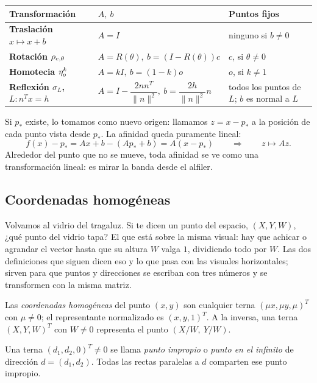 \begin{center}
\begin{tabularx}{\textwidth}{>{\bfseries}l l X}
\toprule
Transformación & \(A,\ b\) & Puntos fijos\\
\midrule
Traslación \(x\mapsto x+b\) & \(A=I\) & ninguno si \(b\neq0\)\\
Rotación \(\rho_{c,\theta}\) & \(A=R(\theta),\ b=(I-R(\theta))c\) & \(c\), si \(\theta\neq0\)\\
Homotecia \(\eta_{o}^{k}\) & \(A=kI,\ b=(1-k)o\) & \(o\), si \(k\neq1\)\\
Reflexión \(\sigma_L\), \(L\colon n^Tx=h\) &
\(A=I-\dfrac{2nn^T}{\lVert n\rVert^2},\
b=\dfrac{2h}{\lVert n\rVert^2}n\) &
todos los puntos de \(L\); \(b\) es normal a \(L\)\\
\bottomrule
\end{tabularx}
\end{center}

Si \(p_\ast\) existe, lo tomamos como nuevo origen: llamamos \(z=x-p_\ast\) a la posición de
cada punto vista desde \(p_\ast\). La afinidad queda puramente lineal:
\[
  f(x)-p_\ast=Ax+b-(Ap_\ast+b)=A(x-p_\ast)
  \qquad\Longrightarrow\qquad
  z\mapsto Az .
\]
Alrededor del punto que no se mueve, toda afinidad se ve como una transformación lineal: es
mirar la banda desde el alfiler.

\subsection{Coordenadas homogéneas}\label{sec:homogeneas}

Volvamos al vidrio del tragaluz. Si te dicen un punto del espacio, \((X,Y,W)\), ¿qué punto del
vidrio tapa? El que está sobre la misma visual: hay que achicar o agrandar el vector hasta que
su altura \(W\) valga \(1\), dividiendo todo por \(W\). Las dos definiciones que siguen dicen
eso y lo que pasa con las visuales horizontales; sirven para que puntos y direcciones se
escriban con tres números y se transformen con la misma matriz.

\begin{definicion}\label{def:06-homogeneas}
Las \emph{coordenadas homogéneas} del punto \((x,y)\) son cualquier terna
\((\mu x,\mu y,\mu)^T\) con \(\mu\neq0\); el representante normalizado es \((x,y,1)^T\). A la
inversa, una terna \((X,Y,W)^T\) con \(W\neq0\) representa el punto \((X/W,\ Y/W)\).
\end{definicion}

\begin{definicion}\label{def:06-impropio}
Una terna \((d_1,d_2,0)^T\neq0\) se llama \emph{punto impropio} o \emph{punto en el infinito}
de dirección \(d=(d_1,d_2)\). Todas las rectas paralelas a \(d\) comparten ese punto impropio.
\end{definicion}

